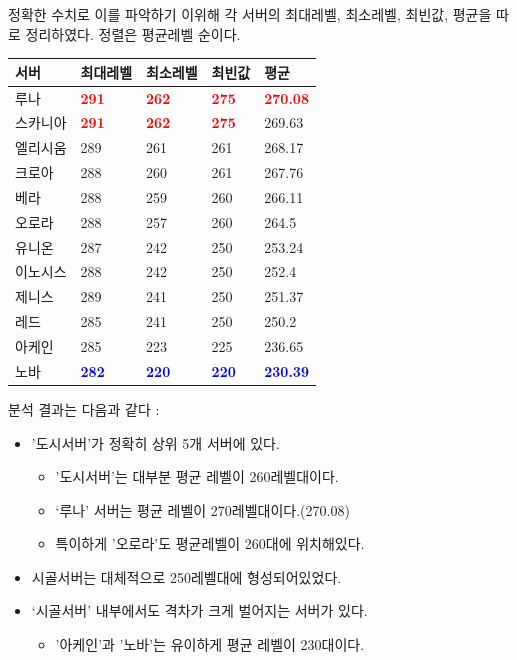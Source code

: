 \documentclass[
]{article}
\providecommand{\tightlist}{%
  \setlength{\itemsep}{0pt}\setlength{\parskip}{0pt}}
\begin{document}
정확한 수치로 이를 파악하기 이위해 각 서버의 최대레벨, 최소레벨, 최빈값,
평균을 따로 정리하였다. 정렬은 평균레벨 순이다.

\begin{table}[H]
\centering
\begin{tabular}{l|l|l|l|l}
\hline
서버 & 최대레벨 & 최소레벨 & 최빈값 & 평균\\
\hline
루나 & \textcolor{red}{\textbf{291}} & \textcolor{red}{\textbf{262}} & \textcolor{red}{\textbf{275}} & \textcolor{red}{\textbf{270.08}}\\
\hline
스카니아 & \textcolor{red}{\textbf{291}} & \textcolor{red}{\textbf{262}} & \textcolor{red}{\textbf{275}} & 269.63\\
\hline
엘리시움 & 289 & 261 & 261 & 268.17\\
\hline
크로아 & 288 & 260 & 261 & 267.76\\
\hline
베라 & 288 & 259 & 260 & 266.11\\
\hline
오로라 & 288 & 257 & 260 & 264.5\\
\hline
유니온 & 287 & 242 & 250 & 253.24\\
\hline
이노시스 & 288 & 242 & 250 & 252.4\\
\hline
제니스 & 289 & 241 & 250 & 251.37\\
\hline
레드 & 285 & 241 & 250 & 250.2\\
\hline
아케인 & 285 & 223 & 225 & 236.65\\
\hline
노바 & \textcolor{blue}{\textbf{282}} & \textcolor{blue}{\textbf{220}} & \textcolor{blue}{\textbf{220}} & \textcolor{blue}{\textbf{230.39}}\\
\hline
\end{tabular}
\end{table}

분석 결과는 다음과 같다 :

\begin{itemize}
\item
  '도시서버'가 정확히 상위 5개 서버에 있다.

  \begin{itemize}
  \item
    '도시서버'는 대부분 평균 레벨이 260레벨대이다.
  \item
    `루나' 서버는 평균 레벨이 270레벨대이다.(270.08)
  \item
    특이하게 '오로라'도 평균레벨이 260대에 위치해있다.
  \end{itemize}
\item
  시골서버는 대체적으로 250레벨대에 형성되어있었다.
\item
  `시골서버' 내부에서도 격차가 크게 벌어지는 서버가 있다.

  \begin{itemize}
  \tightlist
  \item
    '아케인'과 '노바'는 유이하게 평균 레벨이 230대이다.
  \end{itemize}
\end{itemize}
\end{document}
